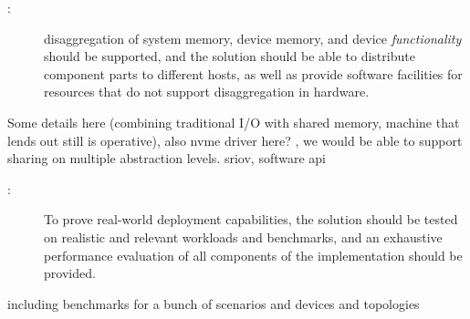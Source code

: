     
\begin{description}
    \item[:] \Gls{disaggregation} of system memory, device memory, and device \emph{functionality} should be supported, and the solution should be able to distribute component parts to different hosts, as well as provide software facilities for resources that do not support \gls{disaggregation} in hardware.
\end{description}


Some details here (combining traditional I/O with shared memory, machine that lends out still is operative), also nvme driver here? , we would be able to support sharing on multiple abstraction levels. sriov, software \gls{api}


\begin{description}    
    \item[:] To prove real-world deployment capabilities, the solution should be tested on realistic and relevant workloads and benchmarks, and an exhaustive performance evaluation of all components of the implementation should be provided.
 \end{description}
including benchmarks for a bunch of scenarios and devices and topologies


%

